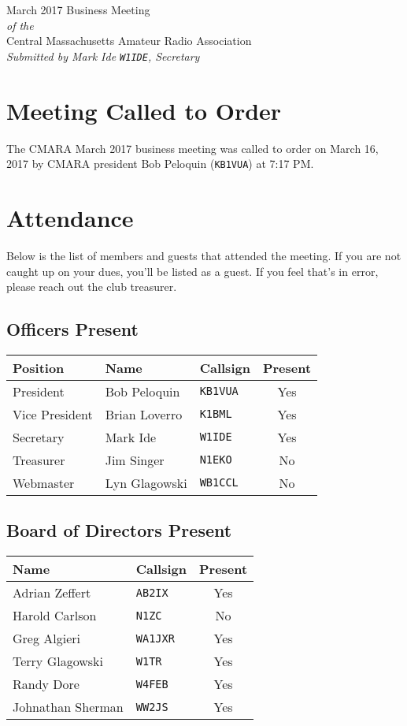 \documentclass[10pt,letterpaper]{article}
\begin{document}
\begin{center}
{\huge March 2017 Business Meeting}\\
\emph{of the}\\
{\Large Central Massachusetts Amateur Radio Association}\\
\emph{Submitted by Mark Ide \texttt{W1IDE}, Secretary}
\end{center}

\section{Meeting Called to Order}
The CMARA March 2017 business meeting was called to order on March 16, 2017 by CMARA president Bob Peloquin (\texttt{KB1VUA}) at 7:17 PM.

\section{Attendance}
\noindent
Below is the list of members and guests that attended the meeting. If you are not caught up on your dues, you'll be listed as a guest. If you feel that's in error, please reach out the club treasurer.

\subsection{Officers Present}
\begin{tabular}{|l|l|l|c|}
  \hline
  \textbf{Position} & \textbf{Name}  & \textbf{Callsign} & \textbf{Present} \\ \hline
  President         & Bob Peloquin   & \texttt{KB1VUA}   & Yes \\
  Vice President    & Brian Loverro  & \texttt{K1BML}    & Yes \\
  Secretary         & Mark Ide       & \texttt{W1IDE}    & Yes \\
  Treasurer         & Jim Singer     & \texttt{N1EKO}    & No \\
  Webmaster         & Lyn Glagowski  & \texttt{WB1CCL}   & No \\
  \hline
\end{tabular}

\subsection{Board of Directors Present}
\begin{tabular}{|l|l|c|}
  \hline
  \textbf{Name}     & \textbf{Callsign} & \textbf{Present} \\ \hline
  Adrian Zeffert    & \texttt{AB2IX}    & Yes \\
  Harold Carlson    & \texttt{N1ZC}     & No \\
  Greg Algieri      & \texttt{WA1JXR}   & Yes \\
  Terry Glagowski   & \texttt{W1TR}     & Yes \\
  Randy Dore        & \texttt{W4FEB}    & Yes \\
  Johnathan Sherman & \texttt{WW2JS}    & Yes \\
  \hline
\end{tabular}
\end{document}
